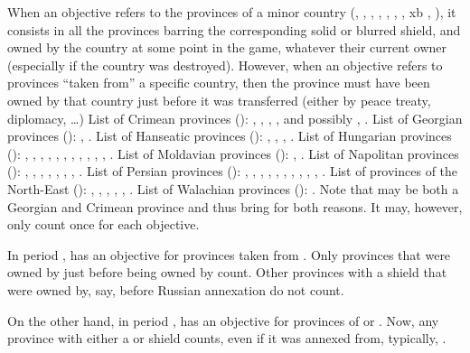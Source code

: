  When an objective refers to the provinces of a
minor country (\paysCrimee, \paysGeorgie, \paysHanse, \paysHongrie,
\paysMoldavie, \paysPerse, \paysNaples, xb
\paysprovincesne,
\paysValachie), it consists in all the provinces barring the
corresponding solid or blurred shield, and owned by the country at some
point in the game, whatever their current owner (especially if the
country was destroyed).
\bparag However, when an objective refers to provinces ``taken from''
a specific country, then the province must have been owned by that
country just before it was transferred (either by peace treaty,
diplomacy, \ldots)
\bparag List of Crimean provinces ():
\provinceKhadzhibei, \provinceZaporozhye, \provinceCrimee,
\provinceAzov, and possibly \provinceCaffa, \provinceKuban.
\bparag List of Georgian provinces ():
\provinceGeorgie, \provinceKuban.
\bparag List of Hanseatic provinces ():
\provinceBremen, \provinceLubeck, \provinceHolstein,
\provinceMecklenburg.
\bparag List of Hungarian provinces ():
\provinceMures, \provinceErdely, \provinceBukovina, \provinceKarpatok,
\provinceSzlovakia, \provinceBalaton, \provinceCarniola,
\provinceKapela, \provinceCroatie, \provincePecs, \provinceMagyarorszag,
\provinceBanat.
\bparag List of Moldavian provinces ():
\provinceMoldova, \provinceBasarabia.
\bparag List of Napolitan provinces ():
\provinceAbruzzo, \provinceCampania, \provinceBasilicata,
\provincePuglia, \provinceCalabria, \provinceSicilia, \provincePalermo,
\provinceSaldigna.
\bparag List of Persian provinces (): \provincePars,
\provinceMeshhed, \provinceBam, \provinceIsfahan, \provinceKermanshah,
\provinceAzarbayadjan, \provinceKordistan, \provinceVan,
\provinceArmenie, \provinceShirvan, \provinceDagestan.
\bparag List of provinces of the North-East ():
\provinceFriesland, \provinceGelderland, \provinceHolland,
\provinceOverijssel, \provinceUtrecht, \provinceZeeland.
\bparag List of Walachian provinces ():
\provinceValahia.
\bparag Note that \provinceKuban may be both a Georgian and Crimean
province and thus bring \VPs for both reasons. It may, however, only
count once for each objective.

\begin{exemple}
  In period , \RUS has an objective for provinces taken from
  \paysCrimee. Only provinces that were owned by \paysCrimee just before
  being owned by \RUS count. Other provinces with a 
  shield that were owned by, say, \paysUkraine before Russian annexation
  do not count.

  On the other hand, in period , \RUS has an objective for
  provinces of \paysGeorgie or \paysPerse. Now, any province with either
  a  or  shield counts, even if
  it was annexed from, typically, \TUR. 
\end{exemple}

